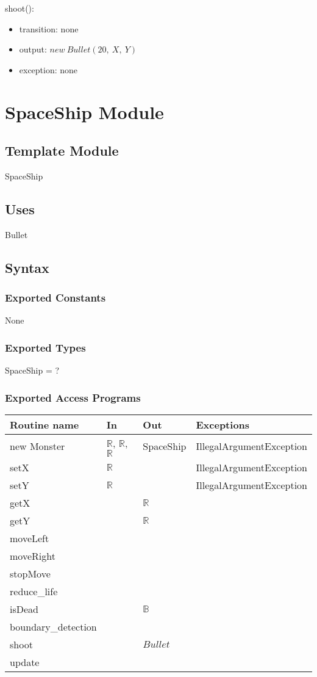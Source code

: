\documentclass[12pt]{article}
\begin{document}
\noindent shoot():
\begin{itemize}
\item transition: none
\item output: $new\ Bullet(20,\ X,\ Y)$
\item exception: none
\end{itemize}
\newpage

\section{SpaceShip Module}

\subsection*{Template Module}
SpaceShip

\subsection*{Uses}
Bullet

\subsection*{Syntax}
\subsubsection*{Exported Constants}
None
\subsubsection*{Exported Types}
SpaceShip = ?
\subsubsection*{Exported Access Programs}
\begin{tabular}{| l | l | l | p{5cm} |}
\hline
\textbf{Routine name} & \textbf{In} & \textbf{Out} & \textbf{Exceptions}\\
\hline
new Monster & $\mathbb{R}$, $\mathbb{R}$, $\mathbb{R}$ & SpaceShip & IllegalArgumentException\\
\hline
setX & $\mathbb{R}$ &  & IllegalArgumentException\\
\hline
setY & $\mathbb{R}$ &  & IllegalArgumentException\\
\hline
getX &    & $\mathbb{R}$ & \\
\hline
getY &    & $\mathbb{R}$ & \\
\hline
moveLeft & & &\\
\hline
moveRight & & &\\
\hline
stopMove & & &\\
\hline
reduce\_life & & & \\
\hline
isDead & & $\mathbb{B}$ & \\
\hline
boundary\_detection & & &\\
\hline
shoot & & $Bullet$ &\\
\hline
update &&&\\
\hline
\end{tabular}
\end{document}
